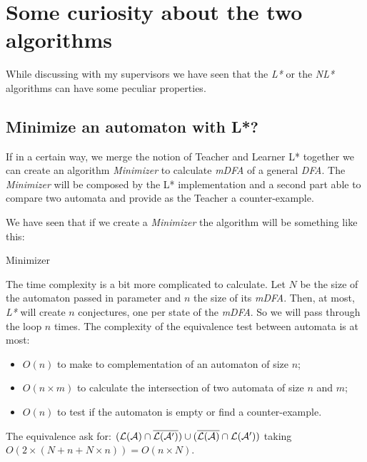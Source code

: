 \section{Some curiosity about the two algorithms}

While discussing with my supervisors we have seen that the \textit{L*} or the \textit{NL*} algorithms can have some peculiar properties.

\subsection{Minimize an automaton with L*?}

If in a certain way, we merge the notion of Teacher and Learner L* together we can create an algorithm \textit{Minimizer} to calculate \textit{mDFA} of a general \textit{DFA}. The \textit{Minimizer} will be composed by the L* implementation and a second part able to compare two automata and provide as the Teacher a counter-example.

We have seen that if we create a \textit{Minimizer} the algorithm will be something like this:

\begin{algorithm}[h]
  \caption{Minimizer}

\end{algorithm}



The time complexity is a bit more complicated to calculate. Let $N$ be the size of the automaton passed in parameter and $n$ the size of its \textit{mDFA}. Then, at most, \textit{L*} will create $n$ conjectures, one per state of the \textit{mDFA}. So we will pass through the loop $n$ times. The complexity of the equivalence test between automata is at most:
\begin{itemize}
  \item $O(n)$ to make to complementation of an automaton of size $n$;
  \item $O(n \times m)$ to calculate the intersection of two automata of size $n$ and $m$;
  \item $O(n)$ to test if the automaton is empty or find a counter-example.
\end{itemize}
The equivalence ask for: $(\mathcal{L}(\mathcal{A}) \cap \overline{\mathcal{L}(\mathcal{A}')}) \cup (\overline{\mathcal{L}(\mathcal{A})} \cap \mathcal{L}(\mathcal{A}'))$ taking $O(2 \times (N + n + N \times n)) = O(n \times N)$.

